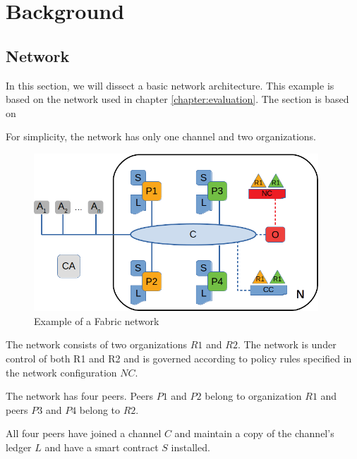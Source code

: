 \chapter{Background}
\label{chapter:background}

\section{Network}
\label{section:network}

In this section, we will dissect a basic network architecture. This example is based on the network used in chapter \ref{chapter:evaluation}. The section is based on \cite{fabricdocs:network}

For simplicity, the network has only one channel and two organizations.

\vskip 0.5cm

\begin{figure}[hp]
\begin{center}
\includegraphics[width=0.95\textwidth]{figures/network}
\end{center}
\caption{Example of a Fabric network}
\label{fig:net}
\end{figure}


The network consists of two organizations $R1$ and $R2$. The network is under control of both R1 and R2 and is governed according to policy rules specified in the network configuration $NC$.

The network has four peers. Peers $P1$ and $P2$ belong to organization $R1$ and peers $P3$ and $P4$ belong to $R2$.

All four peers have joined a channel $C$ and maintain a copy of the channel's ledger $L$ and have a smart contract $S$ installed.

